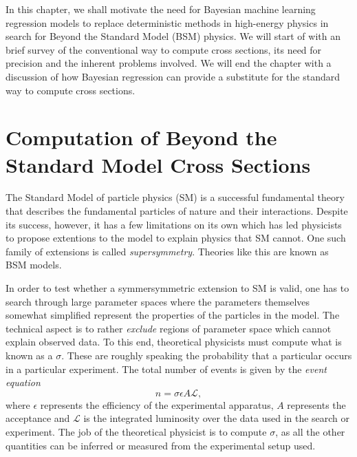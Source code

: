 In this chapter, we shall motivate the need for Bayesian machine learning regression models to replace deterministic methods in high-energy physics in search for Beyond the Standard Model (BSM) physics. We will start of with an brief survey of the conventional way to compute cross sections, its need for precision and the inherent problems involved. We will end the chapter with a discussion of how Bayesian regression can provide a substitute for the standard way to compute cross sections.


\section{Computation of Beyond the Standard Model Cross Sections}
The Standard Model of particle physics (SM) is a successful fundamental theory that describes the fundamental particles of nature and their interactions.  Despite its success, however, it has a few limitations on its own which has led physicists to propose extentions to the model to explain physics that SM cannot. One such family of extensions is called \textit{supersymmetry}. Theories like this are known as BSM models. 

In order to test whether a symmersymmetric extension to SM is valid, one has to search through large parameter spaces where the parameters themselves somewhat simplified represent the properties of the particles in the model. The technical aspect is to rather \textit{exclude} regions of parameter space which cannot explain observed data. To this end, theoretical physicists must compute what is known as a  $\sigma$. These are roughly speaking the probability that a particular  occurs in a particular experiment. The total number of events is given by the \textit{event equation}
\begin{equation}
    n = \sigma \epsilon A \mathcal{L},
\end{equation}
where $\epsilon$ represents the efficiency of the experimental apparatus, $A$ represents the acceptance and $\mathcal{L}$ is the integrated luminosity over the data used in the search or experiment. The job of the theoretical physicist is to compute $\sigma$, as all the other quantities can be inferred or measured from the experimental setup used.

